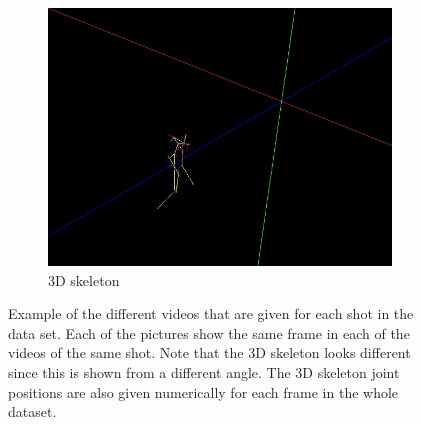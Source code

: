 \begin{figure}
\begin{subfigure}{.49\linewidth}
        \includegraphics[width=\linewidth]{Pics/04_Data/frame53_skelet3D.jpg}
        \caption{3D skeleton}
    \end{subfigure}
    \caption{Example of the different videos that are given for each shot in the data set. Each of the pictures show the same frame in each of the videos of the same shot. Note that the 3D skeleton looks different since this is shown from a different angle. The 3D skeleton joint positions are also given numerically for each frame in the whole dataset.}
    \label{fig:exampleVideosTennis}
\end{figure}